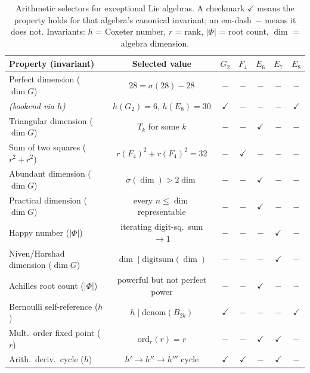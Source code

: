 \documentclass[11pt]{amsart}
\theoremstyle{plain}
\theoremstyle{definition}
\theoremstyle{remark}
\renewcommand{\Phi}{\varPhi}
\begin{document}
\begin{table}[htbp]
\centering
\caption{Arithmetic selectors for exceptional Lie algebras.
A checkmark $\checkmark$ means the property holds for that algebra's
canonical invariant; an em-dash~$-$ means it does not.
Invariants: $h$ = Coxeter number, $r$ = rank,
$|\Phi|$ = root count, $\dim$ = algebra dimension.}
\label{tab:selectors}
\small
\begin{tabular}{lcccccc}
\toprule
\textbf{Property (invariant)} & \textbf{Selected value} &
  $G_2$ & $F_4$ & $E_6$ & $E_7$ & $E_8$ \\
\midrule
Perfect dimension ($\dim G$)             & $28 = \sigma(28)-28$      & $-$ & $-$ & $-$ & $-$ & $-$ \\
\quad\emph{(bookend via $h$)}            & $h(G_2)=6$, $h(E_8)=30$  & $\checkmark$ & $-$ & $-$ & $-$ & $\checkmark$ \\
Triangular dimension ($\dim G$)          & $T_{k}$ for some $k$      & $-$ & $-$ & $\checkmark$ & $-$ & $-$ \\
Sum of two squares ($r^2+r^2$)           & $r(F_4)^2+r(F_4)^2=32$   & $-$ & $\checkmark$ & $-$ & $-$ & $-$ \\
Abundant dimension ($\dim G$)            & $\sigma(\dim)>\!2\dim$    & $-$ & $-$ & $\checkmark$ & $-$ & $-$ \\
Practical dimension ($\dim G$)           & every $n\le\dim$ representable & $-$ & $-$ & $\checkmark$ & $-$ & $-$ \\
Happy number ($|\Phi|$)                  & iterating digit-sq.\ sum $\to 1$ & $-$ & $-$ & $-$ & $\checkmark$ & $-$ \\
Niven/Harshad dimension ($\dim G$)       & $\dim \mid \text{digitsum}(\dim)$ & $-$ & $-$ & $-$ & $\checkmark$ & $-$ \\
Achilles root count ($|\Phi|$)           & powerful but not perfect power & $-$ & $-$ & $\checkmark$ & $-$ & $-$ \\
Bernoulli self-reference ($h$)           & $h \mid \text{denom}(B_{2k})$     & $\checkmark$ & $-$ & $-$ & $-$ & $\checkmark$ \\
Mult.\ order fixed point ($r$)           & $\text{ord}_r(r)=r$               & $-$ & $-$ & $\checkmark$ & $\checkmark$ & $-$ \\
Arith.\ deriv.\ cycle ($h$)              & $h'\!\to h''\!\to h'''$ cycle     & $\checkmark$ & $\checkmark$ & $-$ & $\checkmark$ & $-$ \\
\bottomrule
\end{tabular}
\end{table}
\end{document}

